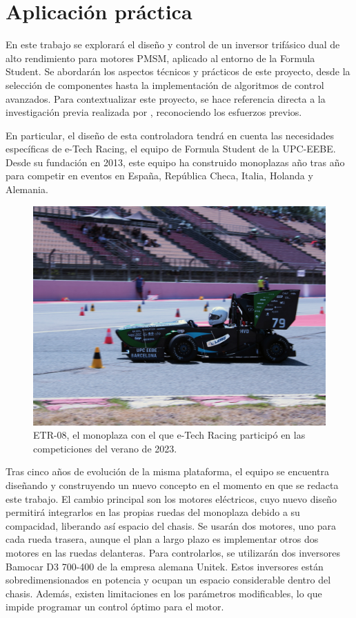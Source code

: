 \section{Aplicación práctica}
En este trabajo se explorará el diseño y control de un inversor trifásico dual de alto rendimiento para motores PMSM, aplicado al entorno de la Formula Student. Se abordarán los aspectos técnicos y prácticos de este proyecto, desde la selección de componentes hasta la implementación de algoritmos de control avanzados. Para contextualizar este proyecto, se hace referencia directa a la investigación previa realizada por \cite{ArranzClos2018}, reconociendo los esfuerzos previos.

En particular, el diseño de esta controladora tendrá en cuenta las necesidades específicas de e-Tech Racing, el equipo de Formula Student de la UPC-EEBE. Desde su fundación en 2013, este equipo ha construido monoplazas año tras año para competir en eventos en España, República Checa, Italia, Holanda y Alemania.

\begin{figure}[H]
	\centering
	\includegraphics[width=0.7\linewidth]{fig/IMG_1834}
	\caption{ETR-08, el monoplaza con el que e-Tech Racing participó en las competiciones del verano de 2023.}
\end{figure}

Tras cinco años de evolución de la misma plataforma, el equipo se encuentra diseñando y construyendo un nuevo concepto en el momento en que se redacta este trabajo. El cambio principal son los motores eléctricos, cuyo nuevo diseño permitirá integrarlos en las propias ruedas del monoplaza debido a su compacidad, liberando así espacio del chasis. Se usarán dos motores, uno para cada rueda trasera, aunque el plan a largo plazo es implementar otros dos motores en las ruedas delanteras. Para controlarlos, se utilizarán dos inversores Bamocar D3 700-400 de la empresa alemana Unitek. Estos inversores están sobredimensionados en potencia y ocupan un espacio considerable dentro del chasis. Además, existen limitaciones en los parámetros modificables, lo que impide programar un control óptimo para el motor.

